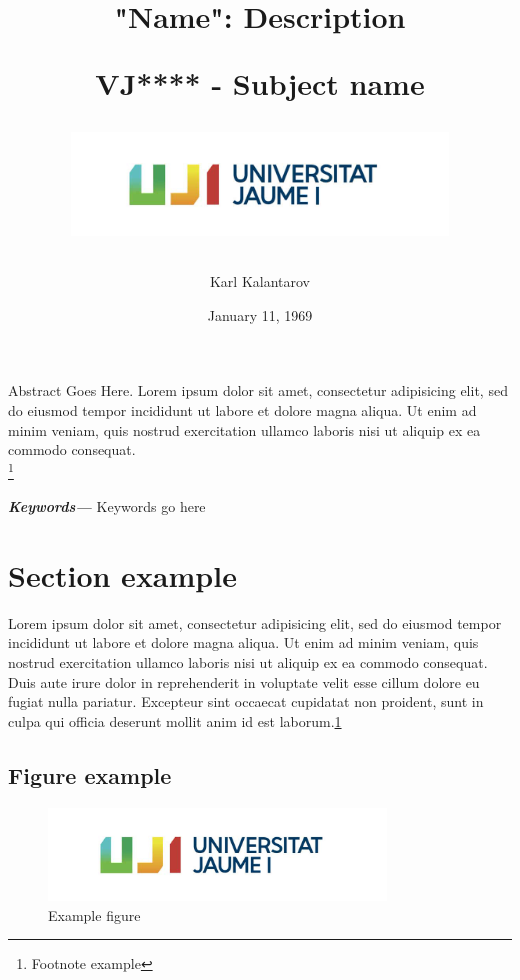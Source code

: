 \documentclass[a4paper]{article}
\title {

	\Huge{"Name": Description}\\[1cm]
	\author {\normalsize \Large{Karl Kalantarov}\\[1cm]}
 \Large{VJ**** - Subject name}
	\begin{figure}[H]
		\centering
			\includegraphics[width = 10cm]{media/uji-logo.jpg}
	\end{figure}
}
\date {
	\color{black} January 11, 1969
}
\providecommand{\keywords}[1]
{
  \small	
  \textbf{\textit{Keywords---}} #1
}
\begin{document}
 


\maketitle
\setcounter{tocdepth}{4}
\thispagestyle{empty}
\clearpage
\abstract
Abstract Goes Here. Lorem ipsum dolor sit amet, consectetur adipisicing elit, sed do eiusmod
tempor incididunt ut labore et dolore magna aliqua. Ut enim ad minim veniam,
quis nostrud exercitation ullamco laboris nisi ut aliquip ex ea commodo
consequat.\\[0.5cm]
\footnote{Footnote example\cite{example-item}}


\keywords{Keywords go here}

\clearpage
\tableofcontents

\clearpage
\listoffigures

\clearpage

\section{Section example}
Lorem ipsum dolor sit amet, consectetur adipisicing elit, sed do eiusmod
tempor incididunt ut labore et dolore magna aliqua. Ut enim ad minim veniam,
quis nostrud exercitation ullamco laboris nisi ut aliquip ex ea commodo
consequat. Duis aute irure dolor in reprehenderit in voluptate velit esse
cillum dolore eu fugiat nulla pariatur. Excepteur sint occaecat cupidatat non
proident, sunt in culpa qui officia deserunt mollit anim id est laborum.\ref{fig:example-fig} %

\subsection{Figure example}
\begin{figure}[H]
	\centering
		\includegraphics[width=0.8\textwidth]{media/uji-logo.jpg}
	\caption{Example figure}
	\label{fig:example-fig}
\end{figure}


\end{document}
